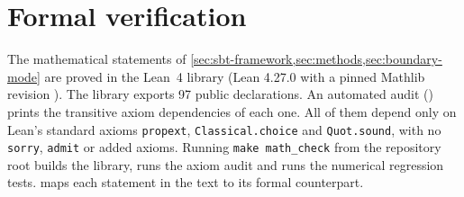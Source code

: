 \section{Formal verification}
\label{app:formal}

The mathematical statements of \cref{sec:sbt-framework,sec:methods,sec:boundary-mode} are proved in the Lean~4 library  (Lean 4.27.0 with a pinned Mathlib revision \cite{lean4,mathlib}). The library exports 97 public declarations. An automated audit () prints the transitive axiom dependencies of each one. All of them depend only on Lean's standard axioms \texttt{propext}, \texttt{Classical.choice} and \texttt{Quot.sound}, with no \texttt{sorry}, \texttt{admit} or added axioms. Running \texttt{make math\_check} from the repository root builds the library, runs the axiom audit and runs the numerical regression tests.  maps each statement in the text to its formal counterpart.

